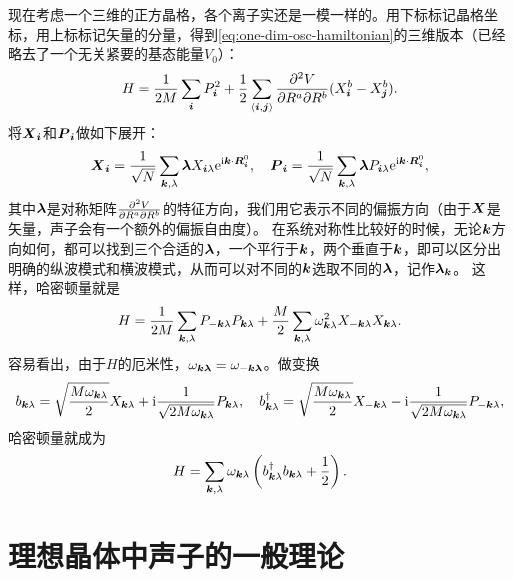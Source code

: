 现在考虑一个三维的正方晶格，各个离子实还是一模一样的。用下标标记晶格坐标，用上标标记矢量的分量，得到\eqref{eq:one-dim-osc-hamiltonian}的三维版本（已经略去了一个无关紧要的基态能量$V_0$）：
\begin{equation}
    {H} = \frac{1}{2 M} \sum_{\vb*{i}} {P}_{\vb*{i}}^2 + \frac{1}{2} \sum_{\langle \vb*{i}, \vb*{j} \rangle} \pdv{V}{R^a}{R^b} (X_{\vb*{i}}^a - X_{\vb*{j}}^a) (X_{\vb*{i}}^b - X_{\vb*{j}}^b).
\end{equation}
将$\vb*{X}_{\vb*{i}}$和$\vb*{P}_{\vb*{i}}$做如下展开：
\begin{equation}
    \vb*{X}_{\vb*{i}} = \frac{1}{\sqrt{N}} \sum_{\vb*{k}, \lambda} \vb*{\lambda} X_{\vb*{i} \lambda} \mathrm{e}^{\mathrm{i} \vb*{k} \cdot \vb*{R}_{\vb*{i}}^0}, \quad \vb*{P}_{\vb*{i}} = \frac{1}{\sqrt{N}} \sum_{\vb*{k}, \lambda} \vb*{\lambda} P_{\vb*{i} \lambda} \mathrm{e}^{\mathrm{i} \vb*{k} \cdot \vb*{R}_{\vb*{i}}^0},
\end{equation}
其中$\vb*{\lambda}$是对称矩阵$\pdv{V}{R^a}{R^b}$的特征方向，我们用它表示不同的偏振方向（由于$\vb*{X}$是矢量，声子会有一个额外的偏振自由度）。
在系统对称性比较好的时候，无论$\vb*{k}$方向如何，都可以找到三个合适的$\vb*{\lambda}$，一个平行于$\vb*{k}$，两个垂直于$\vb*{k}$，即可以区分出明确的纵波模式和横波模式，从而可以对不同的$\vb*{k}$选取不同的$\vb*{\lambda}$，记作$\vb*{\lambda}_{\vb*{k}}$。
这样，哈密顿量就是
\begin{equation}
    {H} = \frac{1}{2 M} \sum_{\vb*{k}, \lambda} {P}_{-\vb*{k} \lambda} {P}_{\vb*{k}\lambda} + \frac{M}{2} \sum_{\vb*{k}, \lambda} \omega_{\vb*{k} \lambda}^2 {X}_{-\vb*{k} \lambda} {X}_{\vb*{k} \lambda}.
\end{equation}
容易看出，由于${H}$的厄米性，$\omega_{\vb*{k}\vb*{\lambda}} = \omega_{-\vb*{k} \vb*{\lambda}}$。做变换
\begin{equation}
    {b}_{\vb*{k} \lambda} = \sqrt{\frac{M \omega_{\vb*{k} \lambda}}{2}} {X}_{\vb*{k} \lambda} + \mathrm{i} \frac{1}{\sqrt{2 M \omega_{\vb*{k} \lambda}}} P_{\vb*{k} \lambda}, \quad {b}^\dagger_{\vb*{k} \lambda} = \sqrt{\frac{M \omega_{\vb*{k} \lambda}}{2}} {X}_{- \vb*{k} \lambda} - \mathrm{i} \frac{1}{\sqrt{2 M \omega_{\vb*{k} \lambda}}} P_{- \vb*{k} \lambda},
    \label{eq:transform-b-pq}
\end{equation}
哈密顿量就成为
\begin{equation}
    {H} = \sum_{\vb*{k}, \lambda} \omega_{\vb*{k} \lambda} \left( {b}^\dagger_{\vb*{k} \lambda} {b}_{\vb*{k} \lambda} + \frac{1}{2} \right).
\end{equation}

\section{理想晶体中声子的一般理论}

